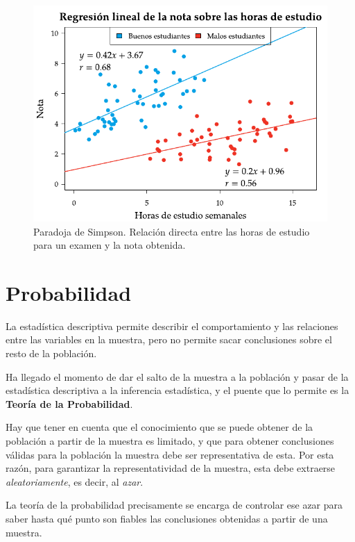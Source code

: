 \documentclass[
  a4paper,
]{scrreport}
\theoremstyle{plain}
\theoremstyle{definition}
\theoremstyle{definition}
\theoremstyle{remark}
\begin{document}
\begin{figure}[H]

{\centering \includegraphics{img/regresion/paradoja_simpson_2.pdf}

}

\caption{Paradoja de Simpson. Relación directa entre las horas de
estudio para un examen y la nota obtenida.}

\end{figure}%


\chapter{Probabilidad}\label{probabilidad}

La estadística descriptiva permite describir el comportamiento y las
relaciones entre las variables en la muestra, pero no permite sacar
conclusiones sobre el resto de la población.

Ha llegado el momento de dar el salto de la muestra a la población y
pasar de la estadística descriptiva a la inferencia estadística, y el
puente que lo permite es la \textbf{Teoría de la Probabilidad}.

Hay que tener en cuenta que el conocimiento que se puede obtener de la
población a partir de la muestra es limitado, y que para obtener
conclusiones válidas para la población la muestra debe ser
representativa de esta. Por esta razón, para garantizar la
representatividad de la muestra, esta debe extraerse
\emph{aleatoriamente}, es decir, al \emph{azar}.

La teoría de la probabilidad precisamente se encarga de controlar ese
azar para saber hasta qué punto son fiables las conclusiones obtenidas a
partir de una muestra.
\end{document}
